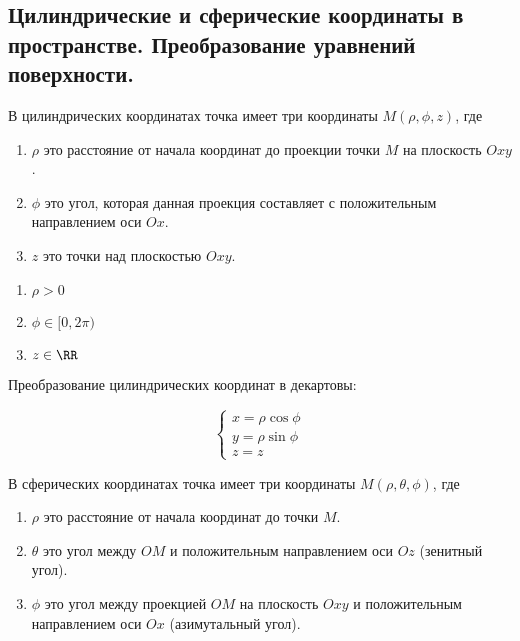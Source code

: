 \subsection{%
  Цилиндрические и сферические координаты в пространстве. Преобразование
  уравнений поверхности.%
}

В цилиндрических координатах точка имеет три координаты \(M (\rho, \phi, z)\),
где

\begin{enumerate}
\item
  \(\rho\) это расстояние от начала координат до проекции точки \(M\) на
  плоскость \(Oxy\).
  
\item
  \(\phi\) это угол, которая данная проекция составляет с положительным
  направлением оси \(Ox\).
  
\item
  \(z\) это  точки над плоскостью \(Oxy\).
\end{enumerate}


\begin{enumerate}
\item
  \(\rho > 0\)
  
\item
  \(\phi \in [0, 2 \pi)\)
  
\item
  \(z \in \RR\)
\end{enumerate}

Преобразование цилиндрических координат в декартовы:

\begin{equation*}
  \begin{cases}
    x = \rho \cos \phi \\
    y = \rho \sin \phi \\
    z = z
  \end{cases}  
\end{equation*}

В сферических координатах точка имеет три координаты \(M (\rho, \theta, \phi)\),
где

\begin{enumerate}
\item
  \(\rho\) это расстояние от начала координат до точки \(M\).
  
\item
  \(\theta\) это угол между \(OM\) и положительным направлением оси \(Oz\)
  (зенитный угол).
  
\item
  \(\phi\) это угол между проекцией \(OM\) на плоскость \(Oxy\) и положительным
  направлением оси \(Ox\) (азимутальный угол).
\end{enumerate}

